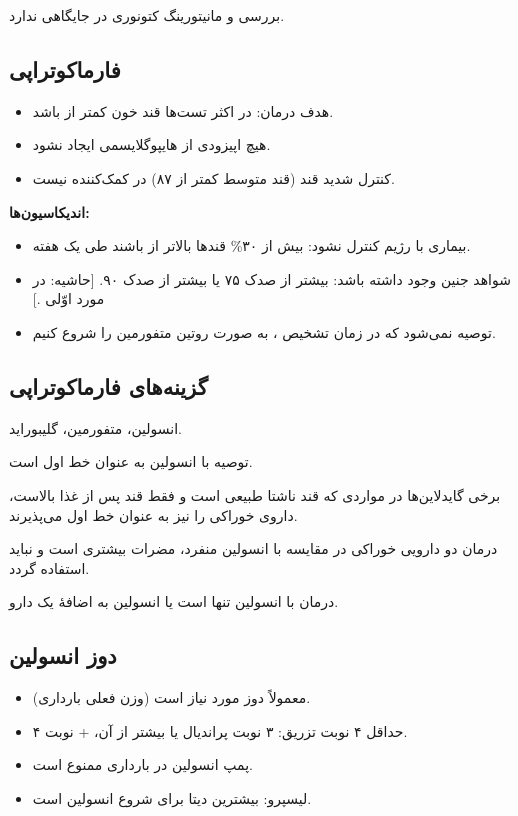 \documentclass[12pt,a4paper]{article}
\begin{document}
بررسی و مانیتورینگ کتونوری در  جایگاهی ندارد.
\subsection*{فارماکوتراپی }
\begin{itemize}
\item هدف درمان: در اکثر تست‌ها قند خون کمتر از  باشد.
\item هیچ اپیزودی از هایپوگلایسمی ایجاد نشود.
\item کنترل شدید قند (قند متوسط کمتر از ۸۷) در  کمک‌کننده نیست.
\end{itemize}
\textbf{اندیکاسیون‌ها:}
\begin{itemize}
\item بیماری با رژیم کنترل نشود: بیش از ۳۰\% قندها بالاتر از  باشند طی یک هفته.
\item شواهد  جنین وجود داشته باشد:  بیشتر از صدک ۷۵ یا  بیشتر از صدک ۹۰. [حاشیه: در مورد اوّلی .]
\item توصیه نمی‌شود که در زمان تشخیص ، به صورت روتین متفورمین را شروع کنیم.
\end{itemize}
\subsection*{گزینه‌های فارماکوتراپی}
انسولین، متفورمین، گلیبوراید.

توصیه با انسولین به عنوان خط اول است.

برخی گایدلاین‌ها در مواردی که قند ناشتا طبیعی است و فقط قند پس از غذا بالاست، داروی خوراکی را نیز به عنوان خط اول می‌پذیرند.

درمان دو دارویی خوراکی در مقایسه با انسولین منفرد، مضرات بیشتری است و نباید استفاده گردد.

درمان با انسولین تنها است یا انسولین به اضافهٔ یک دارو.
\subsection*{دوز انسولین}
\begin{itemize}
\item معمولاً دوز مورد نیاز  است (وزن فعلی بارداری).
\item حداقل ۴ نوبت تزریق: ۳ نوبت پراندیال یا بیشتر از آن، + نوبت ۴. 
\item پمپ انسولین در بارداری ممنوع است.
\item لیسپرو: بیشترین دیتا برای شروع انسولین است.
\end{itemize}
\end{document}
